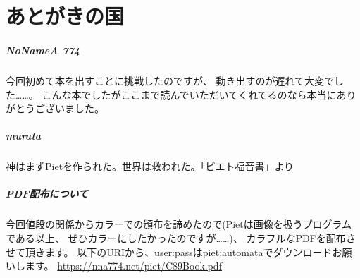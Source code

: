 \chapter[あとがきの国]{あとがきの国}

\paragraph{NoNameA 774}

今回初めて本を出すことに挑戦したのですが、
動き出すのが遅れて大変でした……。
こんな本でしたがここまで読んでいただいてくれてるのなら本当にありがとうございました。

\paragraph{murata}

神はまずPietを作られた。世界は救われた。「ピエト福音書」より

\paragraph{PDF配布について}

今回値段の関係からカラーでの頒布を諦めたので(Pietは画像を扱うプログラムである以上、
ぜひカラーにしたかったのですが……)、
カラフルなPDFを配布させて頂きます。
以下のURIから、user:passはpiet:automataでダウンロードお願いします。
\url{https://nna774.net/piet/C89Book.pdf}

